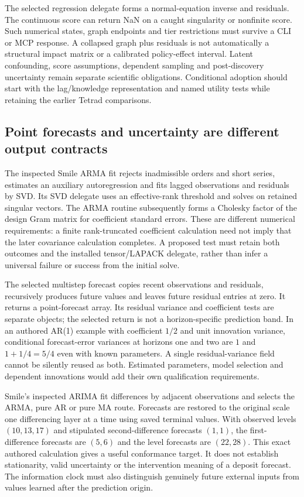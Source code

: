 The selected regression delegate forms a normal-equation inverse and residuals. The continuous score can return NaN on a caught singularity or nonfinite score. Such numerical states, graph endpoints and tier restrictions must survive a CLI or MCP response. A collapsed graph plus residuals is not automatically a structural impact matrix or a calibrated policy-effect interval. Latent confounding, score assumptions, dependent sampling and post-discovery uncertainty remain separate scientific obligations. Conditional adoption should start with the lag/knowledge representation and named utility tests while retaining the earlier Tetrad comparisons.~\citep{exec25_jdyn_tetrad}

\subsection{Point forecasts and uncertainty are different output contracts}

The inspected Smile ARMA fit rejects inadmissible orders and short series, estimates an auxiliary autoregression and fits lagged observations and residuals by SVD. Its SVD delegate uses an effective-rank threshold and solves on retained singular vectors. The ARMA routine subsequently forms a Cholesky factor of the design Gram matrix for coefficient standard errors. These are different numerical requirements: a finite rank-truncated coefficient calculation need not imply that the later covariance calculation completes. A proposed test must retain both outcomes and the installed tensor/LAPACK delegate, rather than infer a universal failure or success from the initial solve.~\citep{exec25_jdyn_smile}

The selected multistep forecast copies recent observations and residuals, recursively produces future values and leaves future residual entries at zero. It returns a point-forecast array. Its residual variance and coefficient tests are separate objects; the selected return is not a horizon-specific prediction band. In an authored AR(1) example with coefficient $1/2$ and unit innovation variance, conditional forecast-error variances at horizons one and two are $1$ and $1+1/4=5/4$ even with known parameters. A single residual-variance field cannot be silently reused as both. Estimated parameters, model selection and dependent innovations would add their own qualification requirements.~\citep{exec25_jdyn_smile,exec25_jdyn_choice}

Smile's inspected ARIMA fit differences by adjacent observations and selects the ARMA, pure AR or pure MA route. Forecasts are restored to the original scale one differencing layer at a time using saved terminal values. With observed levels $(10,13,17)$ and stipulated second-difference forecasts $(1,1)$, the first-difference forecasts are $(5,6)$ and the level forecasts are $(22,28)$. This exact authored calculation gives a useful conformance target. It does not establish stationarity, valid uncertainty or the intervention meaning of a deposit forecast. The information clock must also distinguish genuinely future external inputs from values learned after the prediction origin.~\citep{exec25_jdyn_smile,exec25_jdyn_choice}

